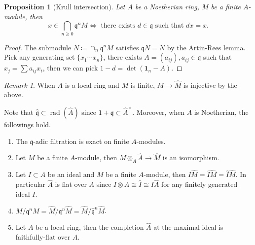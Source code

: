 \documentclass[leqno]{amsart}
\DeclareMathOperator{\rad}{rad}
\newcommand{\id}{\mathbf{1}}
\newcommand{\1}{\mathbf{1}}
\newcommand{\fm}{\mathfrak m}
\newcommand{\fq}{\mathfrak q}
\newtheorem{prop}[thm]{Proposition}
\theoremstyle{definition}
\theoremstyle{remark}
\newtheorem{rem}[thm]{Remark}
\begin{document}
\begin{prop}[Krull intersection]
	Let $A$ be a Noetherian ring,
	$M$ be a finite $A$-module,
	then
	\[
		x\in \bigcap_{n\geq 0} \fq^nM
		\Longleftrightarrow
		\text{ there exists }
		d\in \fq \text{ such that }
		dx=x.
	\]
\end{prop}
\begin{proof}
The submodule $N\coloneqq \cap_n \fq^nM$ satisfies $\fq N=N$ 
by the Artin-Rees lemma. 
Pick any generating set $\{ x_1\cdots x_n \}$,
there exists $A=(a_{ij}), a_{ij}\in \fq$ such that 
$x_j=\sum a_{ij}x_i$,
then we can pick $1-d=\det(\id_{n}-A)$.
\end{proof}
\begin{rem}
	When $A$ is a local ring and $M$ is finite,
	$M\to \hat{M}$ is injective by the above.
\end{rem}
Note that $ \hat{\fq}\subset \rad(\hat{A})$ 
since $1+\fq\subset \hat{A}^\times$.
Moreover, when $A$ is Noetherian, the followings hold.
\begin{enumerate}[label=(\alph*)]
	\item 
	The $\fq$-adic filtration is exact on finite $A$-modules.
	\item 
	Let $M$ be a finite $A$-module,
	then $M\otimes_A\hat{ A }\to \hat{ M }$ is an isomorphism.
	\item 
	Let $I\subset A$ be an ideal and 
	$M$ be a finite $A$-module,
	then $I\hat{M}=\hat{IM}=\hat{I}\hat{M}$.
	In particular $\hat{A}$ is flat over $A$
	since $I\otimes\hat{A}\cong \hat{I}\cong I\hat{A}$ 
	for any finitely generated ideal $I$.
	\item  
	$M/\fq^nM=\hat{M}/\fq^n\hat{M}=\hat{M}/\hat{\fq}^n\hat{M}$.
	\item 
	Let $A$ be a local ring, then
	the completion $\hat{A}$ 
	at the maximal ideal is faithfully-flat over $A$.
\end{enumerate}
\end{document}
